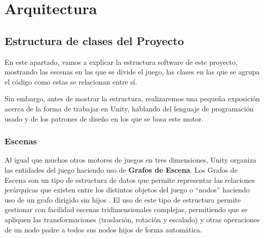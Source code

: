 \chapter{Arquitectura}
\label{Implementación}
\section{Estructura de clases del Proyecto}
En este apartado, vamos a explicar la estructura software de este proyecto, mostrando las escenas en las que se divide el juego, las clases en las que se agrupa el código como estas se relacionan entre sí.

Sin embargo, antes de mostrar la estructura, realizaremos una pequeña exposición acerca de la forma de trabajar en Unity, hablando del lenguaje de programación usado y de los patrones de diseño en los que se basa este motor.

\subsection{Escenas}
Al igual que muchos otros motores de juegos en tres dimensiones, Unity organiza las entidades del juego haciendo uso de \textbf{Grafos de Escena}. Los Grafos de Escena son un tipo de estructura de datos que permite representar las relaciones jerárquicas que existen entre los distintos objetos del juego o ``nodos'' haciendo uso de un grafo dirigido sin hijos \cite{libro_esi}. El uso de este tipo de estructura permite gestionar con facilidad escenas tridimensionales complejas, permitiendo que se apliquen las transformaciones (traslación, rotación y escalado) y otras operaciones de un nodo padre a todos sus nodos hijos de forma automática.


